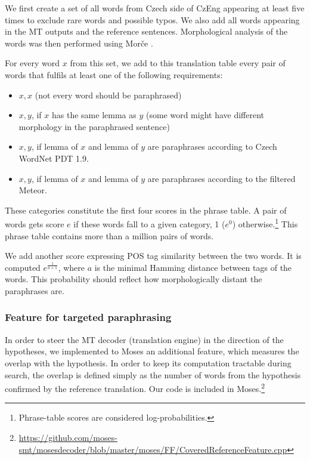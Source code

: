 \documentclass[11pt]{article}
\def\footurl#1{\footnote{\url{#1}}}
\begin{document}
We first create a set of all words from Czech side of CzEng appearing at 
least five times to exclude rare words and possible typos. We also add all 
words appearing in the MT outputs and the reference sentences. Morphological 
analysis of the words was then performed using Morče \cite{morce:2007}. 

For every word $ x $ from this set, we add to this translation table every pair 
of words that fulfils at least one of the following requirements:

\begin{itemize}
\item $ x,x $ (not every word should be paraphrased)
\item $ x,y $, if $ x $ has the same lemma as $ y $ (some word 
might have different morphology in the paraphrased sentence)
\item $ x,y $, if lemma of $ x $ and lemma of $ y $ are paraphrases according 
to Czech WordNet PDT 1.9.
\item $ x,y $, if lemma of $ x $ and lemma of $ y $ are paraphrases according 
to the filtered Meteor.
\end{itemize}

These categories constitute the first four scores in the phrase table. A pair 
of words gets score $ e $ if these words fall to a given category, 1 ($e^0$) 
otherwise.\footnote{Phrase-table scores are considered log-probabilities.} 
This phrase table contains more than a million pairs of words.

We add another score expressing POS tag similarity between the two words. It is 
computed $ e^{\frac{1}{a+1}}$, where $ a $ is the minimal Hamming distance 
between tags of the words. This probability should reflect how morphologically 
distant the paraphrases are. 

\subsubsection{Feature for targeted paraphrasing}
In order to steer the MT decoder (translation engine) in the direction of the 
hypotheses, we implemented to Moses an additional feature, which measures the 
overlap with the hypothesis. In order to keep its computation tractable during 
search, the overlap is defined simply as the number of words from the 
hypothesis confirmed by the reference translation.  Our code is included in
Moses.\footurl{https://github.com/moses-smt/mosesdecoder/blob/master/moses/FF/CoveredReferenceFeature.cpp}
\end{document}
